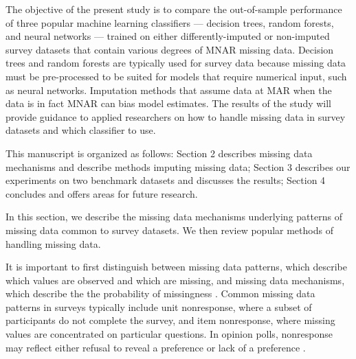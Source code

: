 \documentclass[10pt]{book}
\theoremstyle{definition}
\begin{document}
The objective of the present study is to compare the out-of-sample performance of three popular machine learning classifiers --- decision trees, random forests, and neural networks --- trained on either differently-imputed or non-imputed survey datasets that contain various degrees of MNAR missing data. Decision trees and random forests are typically used for survey data because missing data must be pre-processed to be suited for models that require numerical input, such as neural networks. Imputation methods that assume data at MAR when the data is in fact MNAR can bias model estimates. The results of the study will provide guidance to applied researchers on how to handle missing data in survey datasets and which classifier to use. 

This manuscript is organized as follows: Section 2 describes missing data mechanisms and describe methods imputing missing data; Section 3 describes our experiments on two benchmark datasets and discusses the results; Section 4 concludes and offers areas for future research. 

\par

\lhead[\footnotesize\thepage\fancyplain{}\leftmark]{}\rhead[]{\fancyplain{}\rightmark\footnotesize\thepage}%

\setcounter{chapter}{2}
\setcounter{equation}{0} %

In this section, we describe the missing data mechanisms underlying patterns of missing data common to survey datasets. We then review popular methods of handling missing data.

\par
{}

It is important to first distinguish between missing data patterns, which describe which values are observed and which are missing, and missing data mechanisms, which describe the the probability of missingness  \citep{little2014}. Common missing data patterns in surveys typically include unit nonresponse, where a subset of participants do not complete the survey, and item nonresponse, where missing values are concentrated on particular questions. In opinion polls, nonresponse may reflect either refusal to reveal a preference or lack of a preference \citep{de2003prevention}. 
\end{document}
